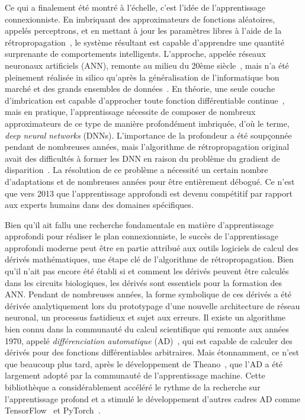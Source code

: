 Ce qui a finalement été montré à l'échelle, c'est l'idée de l'apprentissage connexionniste. En imbriquant des approximateurs de fonctions aléatoires, appelés perceptrons, et en mettant à jour les paramètres libres à l'aide de la rétropropagation~\citep{werbos1990backpropagation, rumelhart1988learning}, le système résultant est capable d'apprendre une quantité surprenante de comportements intelligents. L'approche, appelée réseaux neuronaux artificiels (ANN), remonte au milieu du 20ème siècle~\citep{ivakhnenko1965cybernetic, rosenblatt1958perceptron}, mais n'a été pleinement réalisée in silico qu'après la généralisation de l'informatique bon marché et des grands ensembles de données~\citep{lecun2015deep}. En théorie, une seule couche d'imbrication est capable d'approcher toute fonction différentiable continue~\citep{hornik1989multilayer}, mais en pratique, l'apprentissage nécessite de composer de nombreux approximateurs de ce type de manière profondément imbriquée, d'où le terme, \textit{deep neural networks} (DNNs). L'importance de la profondeur a été soupçonnée pendant de nombreuses années, mais l'algorithme de rétropropagation original avait des difficultés à former les DNN en raison du problème du gradient de disparition~\citep{bengio1994learning}. La résolution de ce problème a nécessité un certain nombre d'adaptations et de nombreuses années pour être entièrement débogué. Ce n'est que vers 2013 que l'apprentissage approfondi est devenu compétitif par rapport aux experts humains dans des domaines spécifiques.

Bien qu'il ait fallu une recherche fondamentale en matière d'apprentissage approfondi pour réaliser le plan connexionniste, le succès de l'apprentissage approfondi moderne peut être en partie attribué aux outils logiciels de calcul des dérivés mathématiques, une étape clé de l'algorithme de rétropropagation. Bien qu'il n'ait pas encore été établi si et comment les dérivés peuvent être calculés dans les circuits biologiques, les dérivés sont essentiels pour la formation des ANN. Pendant de nombreuses années, la forme symbolique de ces dérivés a été dérivée analytiquement lors du prototypage d'une nouvelle architecture de réseau neuronal, un processus fastidieux et sujet aux erreurs. Il existe un algorithme bien connu dans la communauté du calcul scientifique qui remonte aux années 1970, appelé \textit{différenciation automatique} (AD)~\citep{linnainmaa1970representation, griewank1989automatic}, qui est capable de calculer des dérivés pour des fonctions différentiables arbitraires. Mais étonnamment, ce n'est que beaucoup plus tard, après le développement de Theano~\citep{bergstra2010theano}, que l'AD a été largement adopté par la communauté de l'apprentissage machine. Cette bibliothèque a considérablement accéléré le rythme de la recherche sur l'apprentissage profond et a stimulé le développement d'autres cadres AD comme TensorFlow~\citep{abadi2016tensorflow} et PyTorch~\citep{paszke2019pytorch}.

